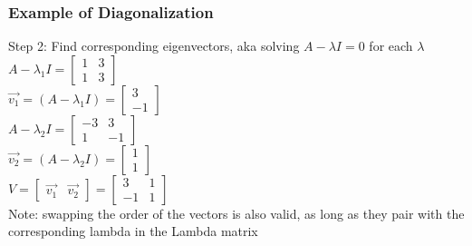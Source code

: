 \documentclass{beamer}
\begin{document}
\begin{frame}
\frametitle{Example of Diagonalization}

Step 2: Find corresponding eigenvectors, aka solving $A-\lambda I = 0$ for each $\lambda$ \\
$A-\lambda_1 I = \begin{bmatrix} 1 & 3 \\ 1 & 3 \end{bmatrix}$ \\
$\vec{v_1} = (A - \lambda_1 I) = \begin{bmatrix} 3 \\ -1\end{bmatrix}$ \\
$A-\lambda_2 I = \begin{bmatrix} -3 & 3 \\ 1 & -1 \end{bmatrix}$ \\
$\vec{v_2} = (A - \lambda_2 I) = \begin{bmatrix} 1 \\ 1\end{bmatrix}$ \\
$V = \begin{bmatrix} \vec{v_1} & \vec{v_2}\end{bmatrix} = \begin{bmatrix} 3 & 1 \\ -1 & 1\end{bmatrix}$ \\
Note: swapping the order of the vectors is also valid, as long as they pair with the corresponding lambda in the Lambda matrix




\end{frame}
\end{document}

